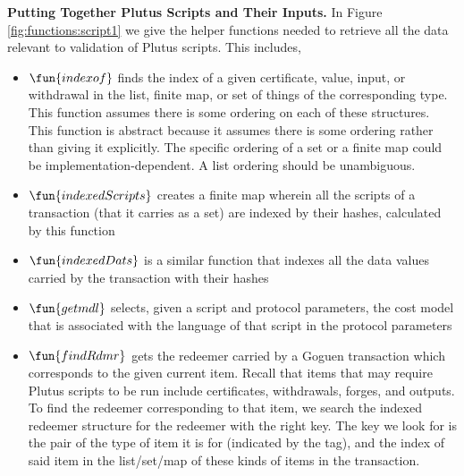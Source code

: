 \clearpage

\textbf{Putting Together Plutus Scripts and Their Inputs.}
In Figure \ref{fig:functions:script1} we give the helper functions needed to
retrieve all the data relevant to validation of Plutus scripts.
This includes,

\begin{itemize}
  \item $\fun{indexof}$ finds the index of a given certificate, value, input, or
  withdrawal in the list, finite map, or set of things of the corresponding type.
  This function assumes there is some ordering on each of these structures.
  This function is abstract because it assumes there is some ordering rather
  than giving it explicitly. The specific ordering of a set or a finite map
  could be implementation-dependent. A list ordering should be unambiguous.
  \item $\fun{indexedScripts}$ creates a finite map wherein all the scripts
  of a transaction (that it carries as a set) are indexed by their hashes,
  calculated by this function
  \item $\fun{indexedDats}$ is a similar function that indexes all the data values
  carried by the transaction with their hashes
  \item $\fun{getmdl}$ selects, given a script and protocol parameters,
  the cost model that is associated with the language of that
  script in the protocol parameters
  \item $\fun{findRdmr}$ gets the redeemer carried by a Goguen transaction
   which corresponds to the given current item. Recall that items that may require
   Plutus scripts to be run include certificates, withdrawals, forges,
   and outputs. To find the redeemer corresponding to that item, we search
   the indexed redeemer structure for the redeemer with the right key.
   The key we look for is the
   pair of the type of item it is for (indicated by the tag), and the index of
   said item in the list/set/map of these kinds of items in the transaction.
\end{itemize}


